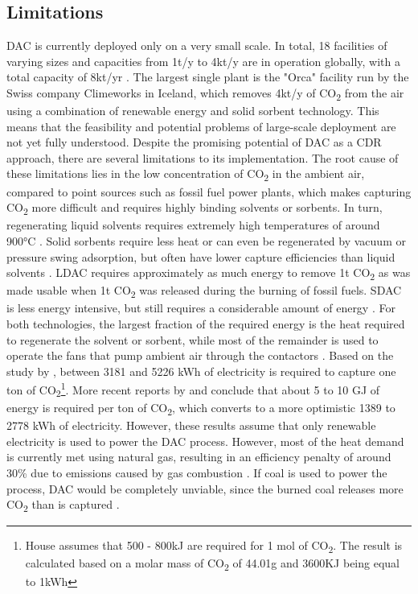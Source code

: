 \subsection*{Limitations}
DAC is currently deployed only on a very small scale. In total, 18 facilities of varying sizes and capacities from 1t/y to 4kt/y are in operation globally, with a total capacity of 8kt/yr \parencite[18]{IEA2022DirectZero}. The largest single plant is the "Orca" facility run by the Swiss company Climeworks in Iceland, which removes 4kt/y of CO\textsubscript{2} from the air using a combination of renewable energy and solid sorbent technology. This means that the feasibility and potential problems of large-scale deployment are not yet fully understood.
Despite the promising potential of DAC as a CDR approach, there are several limitations to its implementation. The root cause of these limitations lies in the low concentration of CO\textsubscript{2} in the ambient air, compared to point sources such as fossil fuel power plants, which makes capturing CO\textsubscript{2} more difficult and requires highly binding solvents or sorbents. In turn, regenerating liquid solvents requires extremely high temperatures of around 900°C \parencite[23]{IEA2022DirectZero}. Solid sorbents require less heat or can even be regenerated by vacuum or pressure swing adsorption, but often have lower capture efficiencies than liquid solvents \parencite[192]{NAS2018NegativeAgenda}.
LDAC requires approximately as much energy to remove 1t CO\textsubscript{2} as was made usable when 1t CO\textsubscript{2} was released during the burning of fossil fuels. SDAC is less energy intensive, but still requires a considerable amount of energy \parencite{Linow2022Kurzimpuls-Perspektiven2-Emissionen}. For both technologies, the largest fraction of the required energy is the heat required to regenerate the solvent or sorbent, while most of the remainder is used to operate the fans that pump ambient air through the contactors \parencite[203]{NAS2018NegativeAgenda}. Based on the study by \textcite{House2007ElectrochemicalChange}, between 3181 and 5226 kWh of electricity is required to capture one ton of CO\textsubscript{2}\footnote{House assumes that 500 - 800kJ are required for 1 mol of CO\textsubscript{2}. The result is calculated based on a molar mass of CO\textsubscript{2} of 44.01g and 3600KJ being equal to 1kWh}. More recent reports by \textcite{NAS2018NegativeAgenda} and \textcite{Mulligan2020CarbonShot:States} conclude that about 5 to 10 GJ of energy is required per ton of CO\textsubscript{2}, which converts to a more optimistic 1389 to 2778 kWh of electricity.
However, these results assume that only renewable electricity is used to power the DAC process. However, most of the heat demand is currently met using natural gas, resulting in an efficiency penalty of around 30\% due to emissions caused by gas combustion \parencite{Fuss2018NegativeEffects}. If coal is used to power the process, DAC would be completely unviable, since the burned coal releases more CO\textsubscript{2} than is captured \parencite{Erans2022DirectChallenges, NRC2015ClimateSequestration}.

